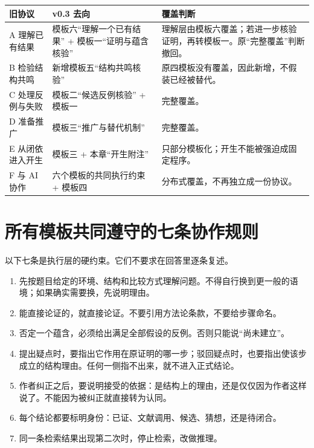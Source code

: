 \documentclass[UTF8,zihao=-4,fontset=none,oneside,openany]{ctexbook}
\begin{document}
\begin{tabularx}{\textwidth}{@{}p{24mm}p{45mm}X@{}}
\toprule
旧协议 & v0.3 去向 & 覆盖判断\\
\midrule
A 理解已有结果 & 模板六“理解一个已有结果” + 模板一“证明与蕴含核验” & 理解层由模板六覆盖；若进一步核验证明，再转模板一。原“完整覆盖”判断撤回。\\
B 检验结构共鸣 & 新增模板五“结构共鸣核验” & 原四模板没有覆盖，因此新增，不假装已经被替代。\\
C 处理反例与失败 & 模板二“候选反例核验” + 模板一 & 完整覆盖。\\
D 准备推广 & 模板三“推广与替代机制” & 完整覆盖。\\
E 从闭依进入开生 & 模板三 + 本章“开生附注” & 只部分模板化；开生不能被强迫成固定程序。\\
F 与 AI 协作 & 六个模板的共同执行约束 + 模板四 & 分布式覆盖，不再独立成一份协议。\\
\bottomrule
\end{tabularx}

\section{所有模板共同遵守的七条协作规则}
以下七条是执行层的硬约束。它们不要求在回答里逐条复述。

\begin{enumerate}[leftmargin=2.2em,itemsep=5pt]
\item 先按题目给定的环境、结构和比较方式理解问题。不得自行换到更一般的语境；如果确实需要换，先说明理由。
\item 能直接论证的，就直接论证。不要引用方法论条款，不要给步骤命名。
\item 否定一个蕴含，必须给出满足全部假设的反例。否则只能说“尚未建立”。
\item 提出疑点时，要指出它作用在原证明的哪一步；驳回疑点时，也要指出使该步成立的结构理由。任何一侧指不出来，就不进入正式结论。
\item 作者纠正之后，要说明接受的依据：是结构上的理由，还是仅仅因为作者这样说了。不能因为被纠正就直接转为认同。
\item 每个结论都要标明身份：已证、文献调用、候选、猜想，还是待闭合。
\item 同一条检索结果出现第二次时，停止检索，改做推理。
\end{enumerate}
\end{document}
